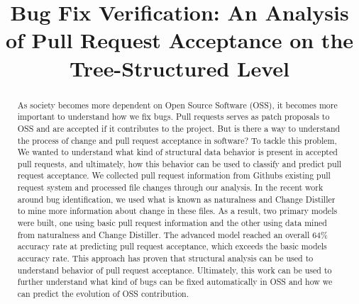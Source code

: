 \documentclass[10pt, conference]{IEEEtran}
\begin{document}
%
\title{Bug Fix Verification: An Analysis of Pull Request Acceptance on the Tree-Structured Level}



\author{
}
\maketitle


\begin{abstract}
As society becomes more dependent on Open Source Software (OSS), it becomes more important to understand how we fix bugs. Pull requests serves as patch proposals to OSS and are accepted if it contributes to the project. But is there a way to understand the process of change and pull request acceptance in software? To tackle this problem, We wanted to understand what kind of structural data behavior is present in accepted pull requests, and ultimately, how this behavior can be used to classify and predict pull request acceptance. We collected pull request information from Github\textquotesingle s existing pull request system and processed file changes through our analysis. In the recent work around bug identification, we used what is known as naturalness and Change Distiller to mine more information about change in these files. As a result, two primary models were built, one using basic pull request information and the other using data mined from naturalness and Change Distiller. The advanced model reached an overall 64\% accuracy rate at predicting pull request acceptance, which exceeds the basic model\textquotesingle s accuracy rate. This approach has proven that structural analysis can be used to understand behavior of pull request acceptance. Ultimately, this work can be used to further understand what kind of bugs can be fixed automatically in OSS and how we can predict the evolution of OSS contribution.
\end{abstract}
\IEEEpeerreviewmaketitle
\end{document}
